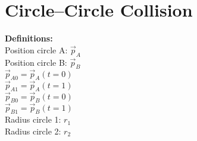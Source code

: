 \documentclass[a4paper,10pt]{scrartcl}
\begin{document}

\section{Circle--Circle Collision}

%     
\noindent
\textbf{Definitions:}\\

\noindent
Position circle A: $\vec{p}_A$ \\
Position circle B: $\vec{p}_B$ \\
$\vec{p}_{A0} = \vec{p}_A(t=0)$ \\
$\vec{p}_{A1} = \vec{p}_A(t=1)$ \\
$\vec{p}_{B0} = \vec{p}_B(t=0)$ \\
$\vec{p}_{B1} = \vec{p}_B(t=1)$ \\
Radius circle 1: $r_1$ \\
Radius circle 2: $r_2$ \\
\end{document}
